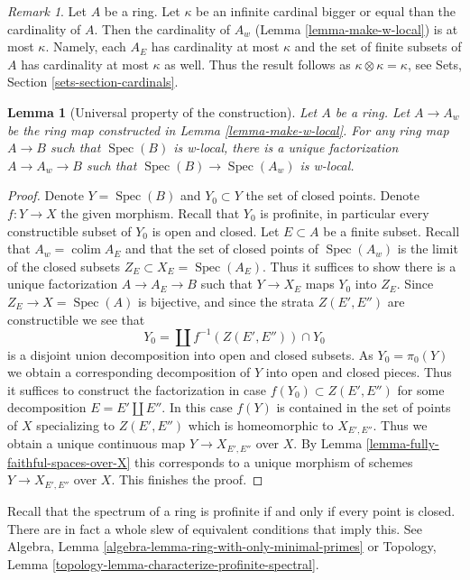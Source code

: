 \documentclass{stacks-project}
\theoremstyle{plain}
\newtheorem{lemma}[subsection]{Lemma}
\theoremstyle{definition}
\theoremstyle{remark}
\newtheorem{remark}[subsection]{Remark}
\numberwithin{equation}{subsection}
\def\colim{\mathop{\mathrm{colim}}\nolimits}
\def\Spec{\mathop{\mathrm{Spec}}}
\begin{document}
\begin{remark}
\label{remark-size-w}
Let $A$ be a ring. Let $\kappa$ be an infinite cardinal bigger or
equal than the cardinality of $A$. Then the cardinality of $A_w$
(Lemma \ref{lemma-make-w-local})
is at most $\kappa$. Namely, each $A_E$ has cardinality at most
$\kappa$ and the set of finite subsets of $A$ has cardinality at most $\kappa$
as well. Thus the result follows as $\kappa \otimes \kappa = \kappa$, see
Sets, Section \ref{sets-section-cardinals}.
\end{remark}

\begin{lemma}[Universal property of the construction]
\label{lemma-universal}
Let $A$ be a ring. Let $A \to A_w$ be the ring map constructed in
Lemma \ref{lemma-make-w-local}. For any ring map $A \to B$ such that
$\Spec(B)$ is w-local, there is a unique factorization $A \to A_w \to B$
such that $\Spec(B) \to \Spec(A_w)$ is w-local.
\end{lemma}

\begin{proof}
Denote $Y = \Spec(B)$ and $Y_0 \subset Y$ the set of closed points.
Denote $f : Y \to X$ the given morphism.
Recall that $Y_0$ is profinite, in particular every constructible
subset of $Y_0$ is open and closed. Let $E \subset A$ be a finite subset.
Recall that $A_w = \colim A_E$ and that the set of closed points of
$\Spec(A_w)$ is the limit of the closed subsets $Z_E \subset X_E = \Spec(A_E)$.
Thus it suffices to show there is a unique factorization $A \to A_E \to B$
such that $Y \to X_E$ maps $Y_0$ into $Z_E$.
Since $Z_E \to X = \Spec(A)$ is bijective, and since the strata
$Z(E', E'')$ are constructible we see that
$$
Y_0 = \coprod f^{-1}(Z(E', E'')) \cap Y_0
$$
is a disjoint union decomposition into open and closed subsets.
As $Y_0 = \pi_0(Y)$ we obtain a corresponding decomposition of
$Y$ into open and closed pieces. Thus it suffices to construct
the factorization in case $f(Y_0) \subset Z(E', E'')$ for
some decomposition $E = E' \amalg E''$.
In this case $f(Y)$ is contained in the set of points of $X$
specializing to $Z(E', E'')$ which is homeomorphic to $X_{E', E''}$.
Thus we obtain a unique continuous map $Y \to X_{E', E''}$ over $X$. By
Lemma \ref{lemma-fully-faithful-spaces-over-X}
this corresponds to a unique morphism of schemes
$Y \to X_{E', E''}$ over $X$. This finishes the proof.
\end{proof}

\noindent
Recall that the spectrum of a ring is profinite if and only if
every point is closed. There are in fact a whole slew of equivalent
conditions that imply this. See
Algebra, Lemma \ref{algebra-lemma-ring-with-only-minimal-primes} or
Topology, Lemma \ref{topology-lemma-characterize-profinite-spectral}.
\end{document}

